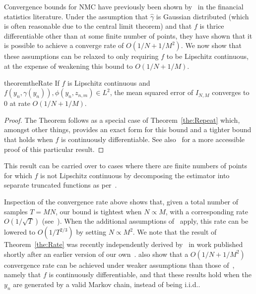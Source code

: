 Convergence bounds for NMC have previously been shown by~\citet{hong2009estimating} in the 
financial statistics literature.  Under the assumption that $\hat{\gamma}$ is Gaussian distributed
(which is often reasonable due to the central limit theorem) and that $f$ is thrice differentiable
other than at some finite number of points, they have shown that it is possible to achieve a
converge rate of $O(1/N+1/M^2)$.  We now show that these assumptions can be relaxed to only requiring
$f$ to be Lipschitz continuous, at the expense of weakening this bound to $O(1/N+1/M)$.
\begin{restatable}{theorem}{theRate} \label{the:Rate}
	If $f$ is Lipschitz continuous and $f(y_n, \gamma(y_n)), \phi(y_n, z_{n,m}) \in
	L^2$, the mean squared error of $I_{N,M}$ converges to $0$ at rate $O\left(1/N +
	1/M\right)$.
\end{restatable}
\begin{proof}
The Theorem follows as a special case of Theorem~\ref{the:Repeat} which,
amongst other things, provides an exact form for this bound and a tighter bound
that holds when $f$ is continuously differentiable.  See also~\cite{rainforth2017pitfalls}
for a more accessible proof of this particular result.
\end{proof}
\begin{remark}
This result can be carried over to cases where there are finite numbers of points for which $f$ is
not Lipschitz continuous by decomposing the estimator into separate truncated functions as
per~\cite{hong2009estimating}.
\end{remark}
Inspection of the convergence rate above shows that, given a total number of samples
$T=MN$, our bound is tightest when $N\propto M$, with a
corresponding rate $O(1/\sqrt{T})$ (see~\cite{rainforth2017pitfalls}). 
When the additional assumptions of~\citet{hong2009estimating}
apply, this rate can be lowered to $O(1/T^{2/3})$ by setting $N \propto M^2$.  
We note that
the result of Theorem~\ref{the:Rate} was recently independently derived by~\citet{fort2016mcmc}
in work published shortly after an earlier version of our own~\citep{rainforth2016pitfalls}.
\citet{fort2016mcmc} also show that a $O(1/N+1/M^2)$ convergence rate can be achieved under
weaker assumptions than those of~\citet{hong2009estimating}, namely that $f$ is continuously differentiable,
and that these results hold when the $y_n$ are generated by a valid Markov chain, instead of being i.i.d..

